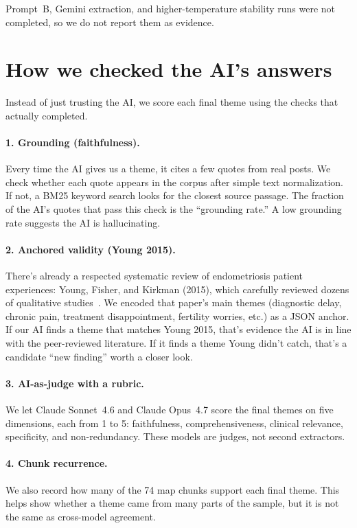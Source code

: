 \documentclass[11pt]{article}
\begin{document}
Prompt~B, Gemini extraction, and higher-temperature stability runs were
not completed, so we do not report them as evidence.

\section{How we checked the AI's answers}

Instead of just trusting the AI, we score each final theme using the
checks that actually completed.

\paragraph{1. Grounding (faithfulness).} Every time the AI gives us a
theme, it cites a few quotes from real posts. We check whether each
quote appears in the corpus after simple text normalization. If not, a
BM25 keyword search looks for the closest source passage. The fraction
of the AI's quotes that pass this check is the ``grounding rate.'' A
low grounding rate suggests the AI is hallucinating.

\paragraph{2. Anchored validity (Young 2015).} There's already a
respected systematic review of endometriosis patient experiences:
Young, Fisher, and Kirkman (2015), which carefully reviewed dozens of
qualitative studies~\cite{young2015}. We encoded that paper's main
themes (diagnostic delay, chronic pain, treatment disappointment,
fertility worries, etc.) as a JSON anchor. If our AI finds a theme
that matches Young 2015, that's evidence the AI is in line with the
peer-reviewed literature. If it finds a theme Young didn't catch,
that's a candidate ``new finding'' worth a closer look.

\paragraph{3. AI-as-judge with a rubric.} We let Claude Sonnet~4.6 and
Claude Opus~4.7 score the final themes on five dimensions, each from 1 to 5:
faithfulness, comprehensiveness, clinical relevance, specificity, and
non-redundancy. These models are judges, not second extractors.

\paragraph{4. Chunk recurrence.} We also record how many of the 74 map
chunks support each final theme. This helps show whether a theme came
from many parts of the sample, but it is not the same as cross-model
agreement.
\end{document}
